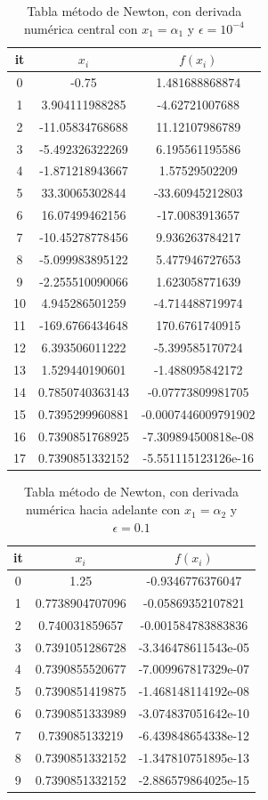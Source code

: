 \documentclass{article} %
\begin{document}
\begin{table}
\centering
\begin{tabular}{|c|c|c|}
\hline
it & $x_i$ & $f(x_i)$\\
\hline
0 & -0.75 & 1.481688868874\\
1 & 3.904111988285 & -4.62721007688\\
2 & -11.05834768688 & 11.12107986789\\
3 & -5.492326322269 & 6.195561195586\\
4 & -1.871218943667 & 1.57529502209\\
5 & 33.30065302844 & -33.60945212803\\
6 & 16.07499462156 & -17.0083913657\\
7 & -10.45278778456 & 9.936263784217\\
8 & -5.099983895122 & 5.477946727653\\
9 & -2.255510090066 & 1.623058771639\\
10 & 4.945286501259 & -4.714488719974\\
11 & -169.6766434648 & 170.6761740915\\
12 & 6.393506011222 & -5.399585170724\\
13 & 1.529440190601 & -1.488095842172\\
14 & 0.7850740363143 & -0.07773809981705\\
15 & 0.7395299960881 & -0.0007446009791902\\
16 & 0.7390851768925 & -7.309894500818e-08\\
17 & 0.7390851332152 & -5.551115123126e-16\\
\hline
\end{tabular}
\caption{Tabla método de Newton, con derivada numérica central con $x_1 = \alpha_1$ y $\epsilon = 10^{-4}$}
\end{table}


\begin{table}[H]
\centering
\begin{tabular}{|c|c|c|}
\hline
it & $x_i$ & $f(x_i)$\\
\hline
0 & 1.25 & -0.9346776376047\\
1 & 0.7738904707096 & -0.05869352107821\\
2 & 0.740031859657 & -0.001584783883836\\
3 & 0.7391051286728 & -3.346478611543e-05\\
4 & 0.7390855520677 & -7.009967817329e-07\\
5 & 0.7390851419875 & -1.468148114192e-08\\
6 & 0.7390851333989 & -3.074837051642e-10\\
7 & 0.739085133219 & -6.439848654338e-12\\
8 & 0.7390851332152 & -1.347810751895e-13\\
9 & 0.7390851332152 & -2.886579864025e-15\\
\hline
\end{tabular}
\caption{Tabla método de Newton, con derivada numérica hacia adelante con $x_1 = \alpha_2$ y $\epsilon = 0.1$}
\end{table}
\end{document}
